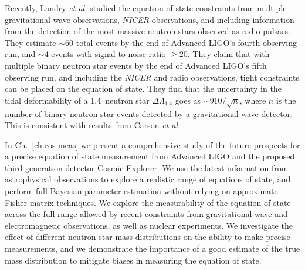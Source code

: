 Recently, Landry \textit{et al.} \cite{Landry:2020vaw} studied the equation of state constraints from multiple gravitational wave observations, \textit{NICER} observations, and including information from the detection of the most massive neutron stars observed as radio pulsars. They estimate $\sim 60$ total events by the end of Advanced LIGO's fourth observing run, and $\sim 4$ events with signal-to-noise ratio $\geq 20$. They claim that with multiple binary neutron star events by the end of Advanced LIGO's fifth observing run, and including the \textit{NICER} and radio observations, tight constraints can be placed on the equation of state. They find that the uncertainty in the tidal deformability of a 1.4\msun\ neutron star $\Delta \Lambda_{1.4}$ goes as $\sim 910/\sqrt{n}$, where $n$ is the number of binary neutron star events detected by a gravitational-wave detector. This is consistent with results from Carson \textit{et al.}

In Ch.~\ref{ch:eos-meas} we present a comprehensive study of the future prospects for a precise equation of state measurement from Advanced LIGO and the proposed third-generation detector Cosmic Explorer. We use the latest information from astrophysical observations to explore a realistic range of equations of state, and perform full Bayesian parameter estimation without relying on approximate Fisher-matrix techniques. We explore the measurability of the equation of state across the full range allowed by recent constraints from gravitational-wave and electromagnetic observations, as well as nuclear experiments. We investigate the effect of different neutron star mass distributions on the ability to make precise measurements, and we demonstrate the importance of a good estimate of the true mass distribution to mitigate biases in measuring the equation of state.